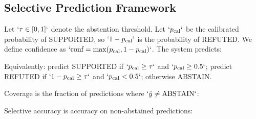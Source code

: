 \subsection{Selective Prediction Framework}\label{selective-prediction-framework}

Let \(`\tau \in [0, 1]`\) denote the abstention threshold. Let \(`p_{\text{cal}}`\) be the calibrated probability of SUPPORTED, so \(`1 - p_{\text{cal}}`\) is the probability of REFUTED. We define confidence as \(`\text{conf} = \max(p_{\text{cal}}, 1 - p_{\text{cal}})`\). The system predicts:

\begin{Shaded}
\begin{Highlighting}[]
\end{Highlighting}
\end{Shaded}

Equivalently: predict SUPPORTED if \(`p_{\text{cal}} \geq \tau`\) and \(`p_{\text{cal}} \geq 0.5`\); predict REFUTED if \(`1 - p_{\text{cal}} \geq \tau`\) and \(`p_{\text{cal}} < 0.5`\); otherwise ABSTAIN.

Coverage is the fraction of predictions where \(`\hat{y} \neq \text{ABSTAIN}`\):

\begin{Shaded}
\begin{Highlighting}[]
\end{Highlighting}
\end{Shaded}

Selective accuracy is accuracy on non-abstained predictions:

\begin{Shaded}
\begin{Highlighting}[]
\end{Highlighting}
\end{Shaded}

